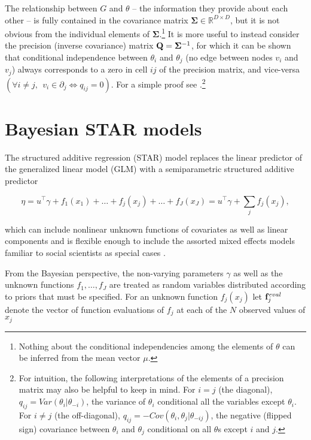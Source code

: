 The relationship between $G$ and $\theta$ -- the information they provide about each other -- is fully contained in the covariance matrix $\boldsymbol{\Sigma} \in \mathbb{R}^{D\times D}$, but it is not obvious from the individual elements of $\boldsymbol{\Sigma}$.\footnote{Nothing about the conditional independencies among the elements of $\theta$ can be inferred from the mean vector $\mu$.} It is more useful to instead consider the precision (inverse covariance) matrix $\mathbf{Q} =\boldsymbol{\Sigma}^{-1}$, for which it can be shown that conditional independence between $\theta_i$ and $\theta_j$ (no edge between nodes $v_i$ and $v_j$) always corresponds to a zero in cell $ij$ of the precision matrix, and vice-versa $(\forall i \neq j, \:\: v_i \in \partial_j \iff q_{ij} = 0)$.  For a simple proof see .\footnote{For intuition, the following interpretations of the elements of a precision matrix may also be helpful to keep in mind. For $i = j$ (the diagonal),  $q_{ij} = Var(\theta_i | \theta_{-i})$, the variance of $\theta_i$ conditional all the variables except $\theta_i$. For $i \neq j$ (the off-diagonal), $q_{ij}  = -Cov(\theta_i, \theta_j | \theta_{-ij}) $, the negative (flipped sign) covariance between $\theta_i$ and $\theta_j$ conditional on all $\theta$s except $i$ and $j$.  }






\section{Bayesian STAR models}
\label{star}

The structured additive regression (STAR) model replaces the linear predictor of the generalized linear model (GLM) with a semiparametric structured additive predictor

\begin{equation*}
\eta =  u^\intercal\gamma + f_1(x_1) + \ldots + f_j(x_j) + \ldots + f_J(x_J) =  u^\intercal\gamma + \sum_{j} f_j (x_j) ,
\end{equation*}

\noindent which can include nonlinear unknown functions of covariates as well as linear components and is flexible enough to include the assorted mixed effects models familiar to social scientists as special cases . 

From the Bayesian perspective, the non-varying parameters $\gamma$ as well as the unknown functions $f_1, \dots, f_J$ are treated as random variables distributed according to priors that must be specified. For an unknown function $f_j(x_j)$ let $\mathbf{f}_j^{eval}$ denote the vector of function evaluations of $f_j$ at each of the $N$ observed values of $x_j$ 

